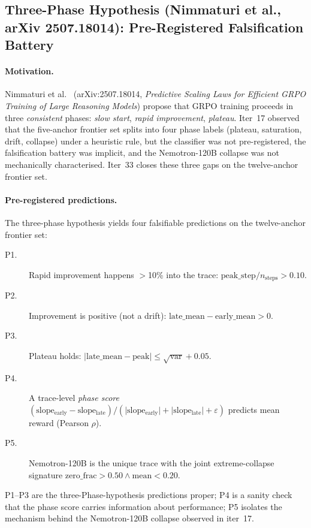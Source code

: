 \subsection{Three-Phase Hypothesis (Nimmaturi et al., arXiv 2507.18014): Pre-Registered Falsification Battery}
\label{sec:scaling-law-iter33}

\paragraph{Motivation.}
Nimmaturi et al.~\citep{nimmaturi2025predictive} (arXiv:2507.18014,
\emph{Predictive Scaling Laws for Efficient GRPO Training of Large
Reasoning Models}) propose that GRPO training proceeds in three
\emph{consistent} phases: \emph{slow start}, \emph{rapid improvement},
\emph{plateau}. Iter~17 observed that the five-anchor frontier set
splits into four phase labels (plateau, saturation, drift, collapse)
under a heuristic rule, but the classifier was not pre-registered, the
falsification battery was implicit, and the Nemotron-120B collapse was
not mechanically characterised. Iter~33 closes these three gaps on the
twelve-anchor frontier set.

\paragraph{Pre-registered predictions.}
The three-phase hypothesis yields four falsifiable predictions on the
twelve-anchor frontier set:
\begin{description}
\item[P1.] Rapid improvement happens $>$10\% into the trace:
  $\mathrm{peak\_step}/n_{\mathrm{steps}} > 0.10$.
\item[P2.] Improvement is positive (not a drift):
  $\mathrm{late\_mean} - \mathrm{early\_mean} > 0$.
\item[P3.] Plateau holds: $\lvert \mathrm{late\_mean} - \mathrm{peak} \rvert
  \le \sqrt{\mathrm{var}} + 0.05$.
\item[P4.] A trace-level \emph{phase score}
  $(\mathrm{slope_{early}} - \mathrm{slope_{late}}) /
  (\lvert\mathrm{slope_{early}}\rvert + \lvert\mathrm{slope_{late}}\rvert
  + \varepsilon)$ predicts mean reward (Pearson $\rho$).
\item[P5.] Nemotron-120B is the unique trace with the joint
  extreme-collapse signature
  $\mathrm{zero\_frac} > 0.50 \wedge \mathrm{mean} < 0.20$.
\end{description}
P1--P3 are the three-Phase-hypothesis predictions proper; P4 is a
sanity check that the phase score carries information about
performance; P5 isolates the mechanism behind the Nemotron-120B
collapse observed in iter~17.

